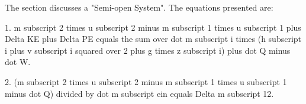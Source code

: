 The section discusses a "Semi-open System". The equations presented are:

1. m subscript 2 times u subscript 2 minus m subscript 1 times u subscript 1 plus Delta KE plus Delta PE equals the sum over dot m subscript i times (h subscript i plus v subscript i squared over 2 plus g times z subscript i) plus dot Q minus dot W.

2. (m subscript 2 times u subscript 2 minus m subscript 1 times u subscript 1 minus dot Q) divided by dot m subscript ein equals Delta m subscript 12.